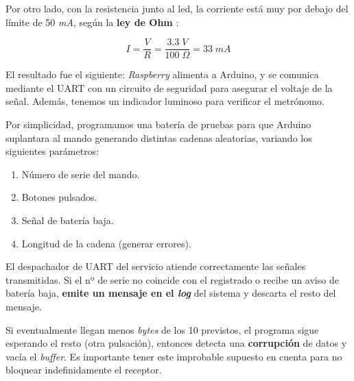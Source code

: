 Por otro lado, con la resistencia junto al \acrshort{led}, la corriente está muy por debajo del límite de 50 \textit{mA}, según la \textbf{ley de Ohm} \cite{wiki_ohm}:

\begin{equation}
	I = \frac{V}{R} = \frac{3.3 \; V}{100 \; \Omega} = 33 \; mA
\end{equation}

El resultado fue el siguiente: \textit{Raspberry} alimenta a Arduino, y se comunica mediante el \acrshort{UART} con un circuito de seguridad para asegurar el voltaje de la señal. Además, tenemos un indicador luminoso para verificar el metrónomo.

Por simplicidad, programamos una batería de pruebas para que Arduino suplantara al mando generando distintas cadenas aleatorias, variando los siguientes parámetros:

\begin{enumerate}
	\item Número de serie del mando.
	\item Botones pulsados.
	\item Señal de batería baja.
	\item Longitud de la cadena (generar errores).
\end{enumerate}

El despachador de \acrshort{UART} del servicio atiende correctamente las señales transmitidas. Si el nº de serie no coincide con el registrado o recibe un aviso de batería baja, \textbf{emite un mensaje en el \textit{log}} del sistema y descarta el resto del mensaje.

Si eventualmente llegan menos \textit{bytes} de los 10 previstos, el programa sigue esperando el resto (otra pulsación), entonces detecta una \textbf{corrupción} de datos y vacía el \textit{buffer}. Es importante tener este improbable supuesto en cuenta para no bloquear indefinidamente el receptor.

\smallskip

